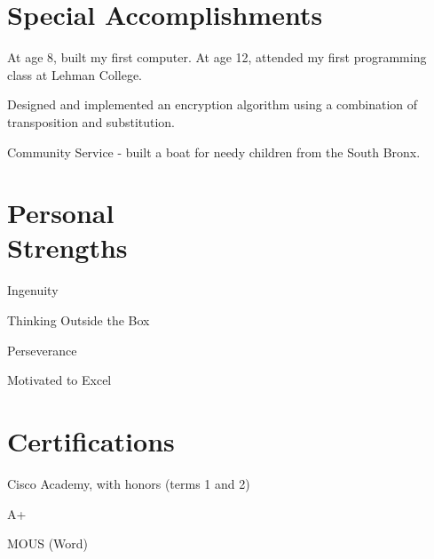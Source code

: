 \documentclass[a4paper,margin,line]{resume}
\begin{document}
\begin{resume}
\section{\mysidestyle Special Accomplishments}
	\begin{asparablank}
		\item At age 8, built my first computer. At age 12, attended my first
		programming class at Lehman College.
		\item Designed and implemented an encryption algorithm using a
		combination of transposition and substitution.
		\item Community Service - built a boat for needy children from the South
		Bronx.
	\end{asparablank}

\section{\mysidestyle Personal \\ Strengths}
	\begin{asparablank}
		\item Ingenuity
		\item Thinking Outside the Box
		\item Perseverance
		\item Motivated to Excel
	\end{asparablank}

\section{\mysidestyle Certifications}
	\begin{asparablank}
		\item Cisco Academy, with honors (terms 1 and 2)
		\item A+
		\item MOUS (Word)
	\end{asparablank}

\end{resume}
\pagebreak[4] %

\end{document}
